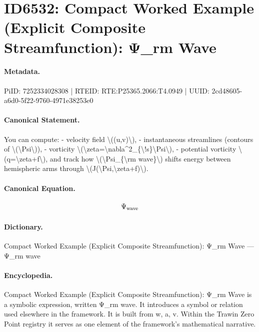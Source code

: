 \section*{ID6532: Compact Worked Example (Explicit Composite Streamfunction): Ψ\_rm Wave}
\paragraph{Metadata.}
PiID: 7252334028308 | RTEID: RTE:P25365.2066:T4.0949 | UUID: 2cd48605-a6d0-5f22-9760-4971e38253e0

\paragraph{Canonical Statement.}
You can compute: - velocity field \textbackslash{}((u,v)\textbackslash{}), - instantaneous streamlines (contours of \textbackslash{}(\textbackslash{}Psi\textbackslash{})), - vorticity \textbackslash{}(\textbackslash{}zeta=\textbackslash{}nabla\textasciicircum{}2\_\{\textbackslash{}!s\}\textbackslash{}Psi\textbackslash{}), - potential vorticity \textbackslash{}(q=\textbackslash{}zeta+f\textbackslash{}), and track how \textbackslash{}(\textbackslash{}Psi\_\{\textbackslash{}rm wave\}\textbackslash{}) shifts energy between hemispheric arms through \textbackslash{}(J(\textbackslash{}Psi,\textbackslash{}zeta+f)\textbackslash{}).

\paragraph{Canonical Equation.}
\[
\Psi_{\rm wave}
\]

\paragraph{Dictionary.}
Compact Worked Example (Explicit Composite Streamfunction): Ψ\_rm Wave — Ψ\_rm wave

\paragraph{Encyclopedia.}
Compact Worked Example (Explicit Composite Streamfunction): Ψ\_rm Wave is a symbolic expression, written Ψ\_rm wave. It introduces a symbol or relation used elsewhere in the framework. It is built from w, a, v. Within the Trawin Zero Point registry it serves as one element of the framework's mathematical narrative.
